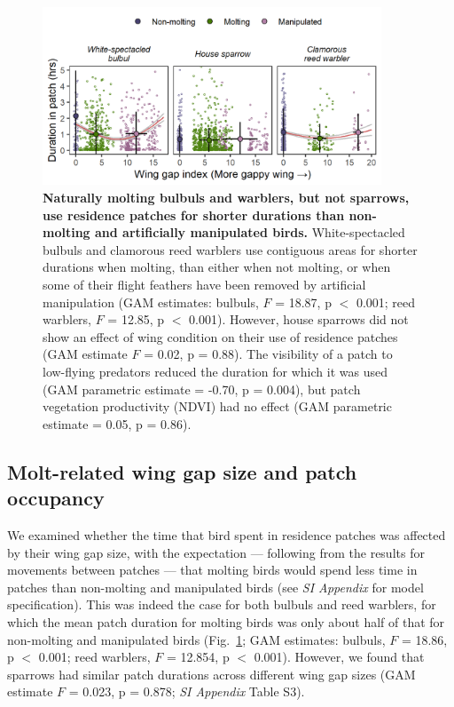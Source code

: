 \begin{refsection}
\begin{figure}%
    \centering
    \includegraphics[width=0.9\textwidth]{figures/holeybirds/fig_03.png}
    \caption{
        \textbf{Naturally molting bulbuls and warblers, but not sparrows, use residence patches for shorter durations than non-molting and artificially manipulated birds.}
        White-spectacled bulbuls and clamorous reed warblers use contiguous areas for shorter durations when molting, than either when not molting, or when some of their flight feathers have been removed by artificial manipulation (GAM estimates: bulbuls, $F$ = 18.87, p $<$ 0.001; reed warblers, $F$ = 12.85, p $<$ 0.001).
        However, house sparrows did not show an effect of wing condition on their use of residence patches (GAM estimate $F$ = 0.02, p = 0.88).
        The visibility of a patch to low-flying predators reduced the duration for which it was used (GAM parametric estimate = -0.70, p = 0.004), but patch vegetation productivity (NDVI) had no effect (GAM parametric estimate = 0.05, p = 0.86).
    }\label{fig_holey_03}
\end{figure}

\subsection*{Molt-related wing gap size and patch occupancy}

We examined whether the time that bird spent in residence patches was affected by their wing gap size, with the expectation --- following from the results for movements between patches --- that molting birds would spend less time in patches than non-molting and manipulated birds (see \textit{SI Appendix} for model specification).
This was indeed the case for both bulbuls and reed warblers, for which the mean patch duration for molting birds was only about half of that for non-molting and manipulated birds (Fig.~\ref{fig_holey_03}; GAM estimates: bulbuls, $F$ = 18.86, p $<$ 0.001; reed warblers, $F$ = 12.854, p $<$ 0.001).
However, we found that sparrows had similar patch durations across different wing gap sizes (GAM estimate $F$ = 0.023, p = 0.878; \textit{SI Appendix} Table S3).


\end{refsection}
